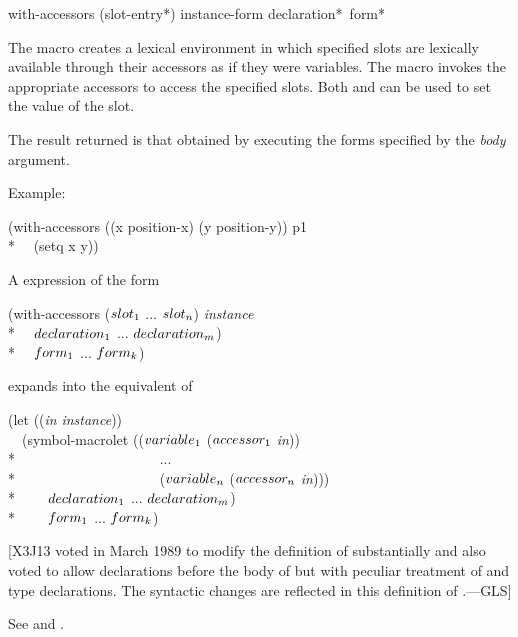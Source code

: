 \begin{defmac}
with-accessors ({slot-entry}*) instance-form
     {declaration}* {\,form}*

The macro  creates a lexical environment in which
specified slots are lexically available through their accessors as if
they were variables.  The macro  invokes the
appropriate accessors to access the specified slots.  Both 
and  can be used to set the value of the slot.

 

The result returned is that obtained by executing the forms specified
by the \emph{body\/} argument.

Example:

\begin{lisp}
(with-accessors ((x position-x) (y position-y)) p1 \\*
~~(setq x y))
\end{lisp}


A  expression of the form
\begin{lisp}
(with-accessors ({\rm $slot_ 1$} ... {\rm $slot_ {n}$}) \emph{instance\/} \\*
~~$declaration_ 1$ ... $declaration_ {m}$) \\*
~~$form_ 1$ ... $form_ {k}$)
\end{lisp}
expands into the equivalent of
\begin{lisp}
(let ((\emph{in\/} \emph{instance\/})) \\
~~(symbol-macrolet (({\rm $variable_ 1$} ({\rm $accessor_ 1$} \emph{in\/})) \\*
~~~~~~~~~~~~~~~~~~~~... \\*
~~~~~~~~~~~~~~~~~~~~({\rm $variable_ {n}$} ({\rm $accessor_ {n}$} \emph{in\/}))) \\*
~~~~$declaration_ 1$ ... $declaration_ {m}$) \\*
~~~~$form_ 1$ ... $form_ {k}$)
\end{lisp}

[X3J13 voted in March 1989
to modify the definition of  substantially
and also voted
 to allow declarations before the body
of  but with peculiar treatment of 
and type declarations.  The syntactic changes are reflected in this definition
of .---GLS]

See  and .
\end{defmac}


